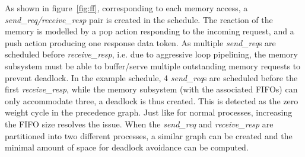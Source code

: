 As shown in figure~\ref{fig:ff}, corresponding to each memory access, a \textit{send\_req/receive\_resp} pair is created in the schedule. The reaction of the memory is modelled by a pop action responding to the incoming request, and a push action producing one response data token.  As multiple \textit{send\_req}s are scheduled
before \textit{receive\_resp}, i.e. due to aggressive loop pipelining, the memory subsystem must be able to buffer/serve multiple outstanding memory requests to prevent deadlock. In the example schedule, 4 \textit{send\_req}s are scheduled before the first \textit{receive\_resp}, while the memory subsystem (with the associated FIFOs) 
can only accommodate three, a deadlock is thus created. This is detected as the
zero weight cycle in the precedence graph. Just like for normal processes, increasing
the FIFO size resolves the issue. When the \textit{send\_req} and \textit{receive\_resp}
are partitioned into two different processes, a similar graph can be created and the minimal amount of space for deadlock avoidance can be computed.

